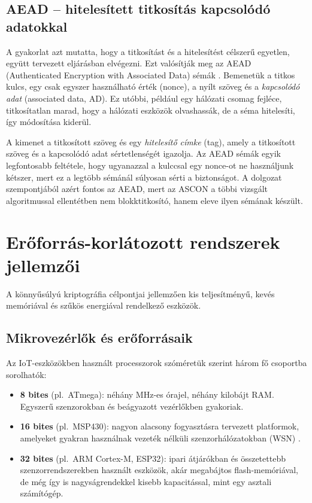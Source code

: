 \documentclass[a4paper,12pt]{report}
\theoremstyle{definition}
\theoremstyle{remark}
\begin{document}
\subsection{AEAD -- hitelesített titkosítás kapcsolódó adatokkal}\label{sec:aead}

A gyakorlat azt mutatta, hogy a titkosítást és a hitelesítést célszerű egyetlen, együtt tervezett eljárásban elvégezni. Ezt valósítják meg az AEAD (Authenticated Encryption with Associated Data) sémák \cite{Dobraunig2021}. Bemenetük a titkos kulcs, egy csak egyszer használható érték (nonce), a nyílt szöveg és a \emph{kapcsolódó adat} (associated data, AD). Ez utóbbi, például egy hálózati csomag fejléce, titkosítatlan marad, hogy a hálózati eszközök olvashassák, de a séma hitelesíti, így módosítása kiderül.

A kimenet a titkosított szöveg és egy \emph{hitelesítő címke} (tag), amely a titkosított szöveg és a kapcsolódó adat sértetlenségét igazolja. Az AEAD sémák egyik legfontosabb feltétele, hogy ugyanazzal a kulccsal egy nonce-ot ne használjunk kétszer, mert ez a legtöbb sémánál súlyosan sérti a biztonságot. A dolgozat szempontjából azért fontos az AEAD, mert az ASCON a többi vizsgált algoritmussal ellentétben nem blokktitkosító, hanem eleve ilyen sémának készült.

\section{Erőforrás-korlátozott rendszerek jellemzői}\label{sec:eroforras}

A könnyűsúlyú kriptográfia célpontjai jellemzően kis teljesítményű, kevés memóriával és szűkös energiával rendelkező eszközök.

\subsection{Mikrovezérlők és erőforrásaik}\label{sec:mikrovezerlok}

Az IoT-eszközökben használt processzorok szóméretük szerint három fő csoportba sorolhatók:
\begin{itemize}
	\item \textbf{8 bites} (pl.~ATmega): néhány MHz-es órajel, néhány kilobájt RAM. Egyszerű szenzorokban és beágyazott vezérlőkben gyakoriak.
	\item \textbf{16 bites} (pl.~MSP430): nagyon alacsony fogyasztásra tervezett platformok, amelyeket gyakran használnak vezeték nélküli szenzorhálózatokban (WSN) \cite{NISTIR8114}.
	\item \textbf{32 bites} (pl.~ARM Cortex-M, ESP32): ipari átjárókban és összetettebb szenzorrendszerekben használt eszközök, akár megabájtos flash-memóriával, de még így is nagyságrendekkel kisebb kapacitással, mint egy asztali számítógép.
\end{itemize}
\end{document}
